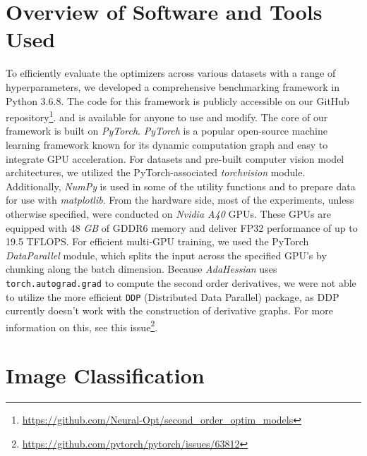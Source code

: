 \section{Overview of Software and Tools Used}
To efficiently evaluate the optimizers across various datasets with a range of hyperparameters,
we developed a comprehensive benchmarking framework in Python 3.6.8.
The code for this framework is publicly accessible on our GitHub repository\footnote{\url{https://github.com/Neural-Opt/second_order_optim_models}}.
and is available for anyone to use and modify. The core of our framework is built on
\emph{PyTorch}. \emph{PyTorch} is a popular open-source machine learning framework known for its dynamic computation graph and easy to integrate GPU acceleration.
For datasets and pre-built computer vision model architectures, we utilized the PyTorch-associated \emph{torchvision} module.
Additionally, \emph{NumPy} is used in some of the utility functions and to prepare data for use with \emph{matplotlib}.
From the hardware side, most of the experiments, unless otherwise specified, were conducted on \emph{Nvidia A40} GPUs.
These GPUs are equipped with 48 \emph{GB} of GDDR6 memory and deliver FP32 performance of up to 19.5 TFLOPS.
For efficient multi-GPU training, we used the PyTorch \emph{DataParallel} module, which splits the input across the specified GPU's by chunking along the batch dimension\cite{pytorch_dataparallel}.
Because \emph{AdaHessian} uses \texttt{torch.autograd.grad} to compute the second order derivatives, we were not
able to utilize the more efficient \texttt{DDP} (Distributed Data Parallel) package, as DDP currently
doesn't work with the construction of derivative graphs. For more information on this, see this
issue\footnote{\url{https://github.com/pytorch/pytorch/issues/63812}}.

\section{Image Classification}

